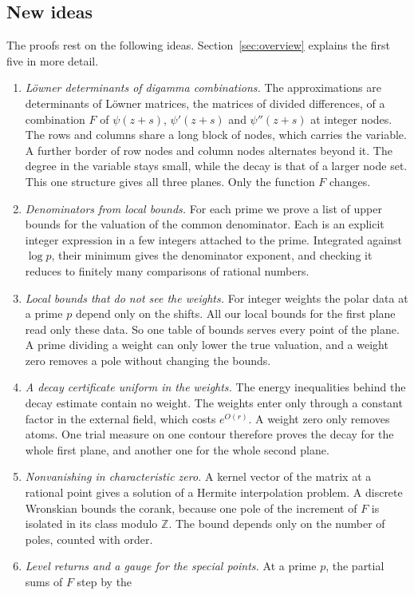 \documentclass[11pt]{amsart}
\theoremstyle{definition}
\theoremstyle{remark}
\numberwithin{equation}{section}
\newcommand{\Z}{\mathbb Z}
\begin{document}
\subsection{New ideas}
The proofs rest on the following ideas. Section~\ref{sec:overview} explains the first five in more detail.
\begin{enumerate}[leftmargin=*]
\item \emph{L\"owner determinants of digamma combinations.} The approximations are determinants of L\"owner matrices,
 the matrices of divided differences, of a combination $F$ of $\psi(z+s)$, $\psi'(z+s)$ and $\psi''(z+s)$ at integer
 nodes. The rows and columns share a long block of nodes, which carries the variable. A further border of row nodes and
 column nodes alternates beyond it. The degree in the variable stays small, while the decay is that of a larger node
 set. This one structure gives all three planes. Only the function $F$ changes.
\item \emph{Denominators from local bounds.} For each prime we prove a list of upper bounds for the valuation of the
 common denominator. Each is an explicit integer expression in a few integers attached to the prime. Integrated
 against $\log p$, their minimum gives the denominator exponent, and checking it reduces to finitely many comparisons of
 rational numbers.
\item \emph{Local bounds that do not see the weights.} For integer weights the polar data at a prime $p$ depend only on
 the shifts. All our local bounds for the first plane read only these data. So one table of bounds serves every point of
 the plane. A prime dividing a weight can only lower the true valuation, and a weight zero removes a pole without
 changing the bounds.
\item \emph{A decay certificate uniform in the weights.} The energy inequalities behind the decay estimate contain no
 weight. The weights enter only through a constant factor in the external field, which costs $e^{O(r)}$. A weight
 zero only removes atoms. One trial measure on one contour therefore proves the decay for the whole first plane, and
 another one for the whole second plane.
\item \emph{Nonvanishing in characteristic zero.} A kernel vector of the matrix at a rational point gives a solution of a
 Hermite interpolation problem. A discrete Wronskian bounds the corank, because one pole of the increment of $F$ is
 isolated in its class modulo $\Z$. The bound depends only on the number of poles, counted with order.
\item \emph{Level returns and a gauge for the special points.} At a prime $p$, the partial sums of $F$ step by the

\end{enumerate}
\end{document}
